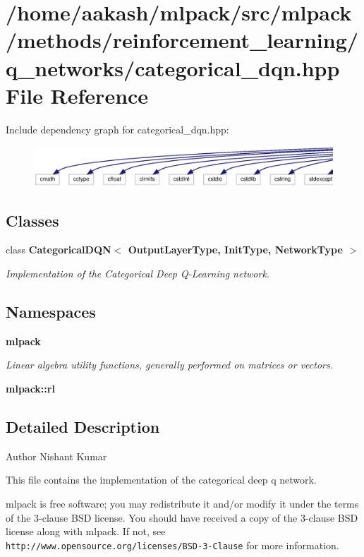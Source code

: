 \section{/home/aakash/mlpack/src/mlpack/methods/reinforcement\+\_\+learning/q\+\_\+networks/categorical\+\_\+dqn.hpp File Reference}
\label{categorical__dqn_8hpp}
Include dependency graph for categorical\+\_\+dqn.\+hpp\+:
\nopagebreak
\begin{figure}[H]
\begin{center}
\leavevmode
\includegraphics[width=350pt]{categorical__dqn_8hpp__incl}
\end{center}
\end{figure}
\subsection*{Classes}
\begin{DoxyCompactItemize}
\item 
class \textbf{ Categorical\+D\+Q\+N$<$ Output\+Layer\+Type, Init\+Type, Network\+Type $>$}
\begin{DoxyCompactList}\small\item\em Implementation of the Categorical Deep Q-\/\+Learning network. \end{DoxyCompactList}\end{DoxyCompactItemize}
\subsection*{Namespaces}
\begin{DoxyCompactItemize}
\item 
 \textbf{ mlpack}
\begin{DoxyCompactList}\small\item\em Linear algebra utility functions, generally performed on matrices or vectors. \end{DoxyCompactList}\item 
 \textbf{ mlpack\+::rl}
\end{DoxyCompactItemize}


\subsection{Detailed Description}
\begin{DoxyAuthor}{Author}
Nishant Kumar
\end{DoxyAuthor}
This file contains the implementation of the categorical deep q network.

mlpack is free software; you may redistribute it and/or modify it under the terms of the 3-\/clause B\+SD license. You should have received a copy of the 3-\/clause B\+SD license along with mlpack. If not, see {\tt http\+://www.\+opensource.\+org/licenses/\+B\+S\+D-\/3-\/\+Clause} for more information. 